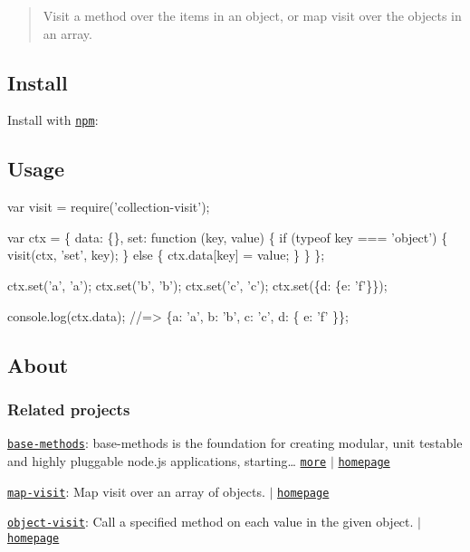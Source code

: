 \begin{quote}
Visit a method over the items in an object, or map visit over the objects in an array. \end{quote}


\subsection*{Install}

Install with \href{https://www.npmjs.com/}{\tt npm}\+:




\subsection*{Usage}


\begin{DoxyCode}
var visit = require('collection-visit');

var ctx = \{
  data: \{\},
  set: function (key, value) \{
    if (typeof key === 'object') \{
      visit(ctx, 'set', key);
    \} else \{
      ctx.data[key] = value;
    \}
  \}
\};

ctx.set('a', 'a');
ctx.set('b', 'b');
ctx.set('c', 'c');
ctx.set(\{d: \{e: 'f'\}\});

console.log(ctx.data);
//=> \{a: 'a', b: 'b', c: 'c', d: \{ e: 'f' \}\};
\end{DoxyCode}


\subsection*{About}

\subsubsection*{Related projects}


\begin{DoxyItemize}
\item \href{https://www.npmjs.com/package/base-methods}{\tt base-\/methods}\+: base-\/methods is the foundation for creating modular, unit testable and highly pluggable node.\+js applications, starting… \href{https://github.com/jonschlinkert/base-methods}{\tt more} $\vert$ \href{https://github.com/jonschlinkert/base-methods}{\tt homepage}
\item \href{https://www.npmjs.com/package/map-visit}{\tt map-\/visit}\+: Map {\ttfamily visit} over an array of objects. $\vert$ \href{https://github.com/jonschlinkert/map-visit}{\tt homepage}
\item \href{https://www.npmjs.com/package/object-visit}{\tt object-\/visit}\+: Call a specified method on each value in the given object. $\vert$ \href{https://github.com/jonschlinkert/object-visit}{\tt homepage}
\end{DoxyItemize}

